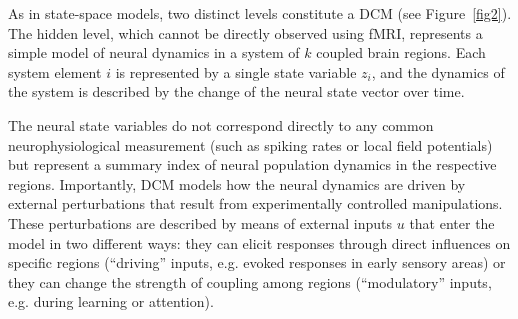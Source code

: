 As in state-space models, two distinct levels constitute a DCM (see Figure~\ref{fig2}).  The hidden level, which cannot be directly observed using fMRI, represents a simple model of neural dynamics in a system of $k$ coupled brain regions.  Each system element $i$ is represented by a single state variable $z_i$, and the dynamics of the system is described by the change of the neural state vector  over time.

The neural state variables do not correspond directly to any common neurophysiological measurement (such as spiking rates or local field potentials) but represent a summary index of neural population dynamics in the respective regions.  Importantly, DCM models how the neural dynamics are driven by external perturbations that result from experimentally controlled manipulations.  These perturbations are described by means of external inputs $u$ that enter the model in two different ways:  they can elicit responses through direct influences on specific regions (``driving'' inputs, e.g. evoked responses in early sensory areas) or they can change the strength of coupling among regions (``modulatory'' inputs, e.g. during learning or attention).

